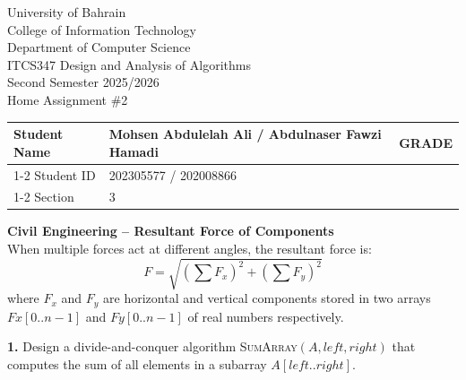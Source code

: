 \documentclass[12pt]{article}
\newcommand{\algoname}[1]{\textsc{#1}}
\begin{document}
\begin{center}
    {\Large University of Bahrain}\\[4pt]
    College of Information Technology\\
    Department of Computer Science\\[6pt]
    ITCS347 Design and Analysis of Algorithms\\
    Second Semester 2025/2026\\[4pt]
    {\large Home Assignment \#2}
\end{center}

\bigskip

\noindent
\begin{tabular}{|l|p{8cm}|p{1.8cm}|}
\hline
Student Name & Mohsen Abdulelah Ali / Abdulnaser Fawzi Hamadi & \multirow{3}{*}{\centering GRADE} \\
\cline{1-2}
Student ID   & 202305577 / 202008866 & \\
\cline{1-2}
Section      & 3 & \\
\hline
\end{tabular}

\bigskip\bigskip

\noindent\textbf{Civil Engineering -- Resultant Force of Components}\\[2pt]
When multiple forces act at different angles, the resultant force is:
\[
    F = \sqrt{\left(\sum F_x\right)^2 + \left(\sum F_y\right)^2}
\]
where $F_x$ and $F_y$ are horizontal and vertical components stored in two
arrays $Fx[0..n-1]$ and $Fy[0..n-1]$ of real numbers respectively.

\bigskip

\noindent\textbf{1.} Design a divide-and-conquer algorithm
\algoname{SumArray}$(A, left, right)$ that computes the sum of all elements
in a subarray $A[left..right]$.

\medskip
\end{document}

